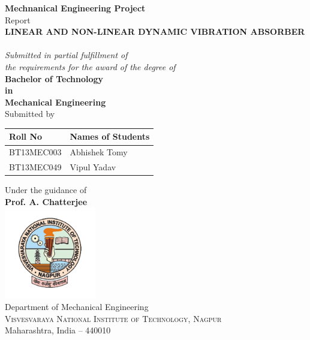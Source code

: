 %
%
%
\begin{titlepage}
\boxit
\begin{center}
\textup{ {\bf Mechnanical Engineering Project} \\ Report}\\[0.2in]
\huge \textbf {\color{red}\uppercase{Linear and Non-linear Dynamic Vibration Absorber}}\\[0.1in]
\Large \textbf{} \\ [0in]
       \small \emph{Submitted in partial fulfillment of\\
       the requirements for the award of the degree of}\\[0.1in]

	{\bf \color{blue} Bachelor of Technology \\in\\ Mechanical Engineering}\\[0.2in]

\normalsize Submitted by \\
\begin{table}[h]
\centering
\begin{tabular}{ll}\hline 
Roll No & Names of Students \\  \hline
BT13MEC003 & Abhishek Tomy\\
BT13MEC049 & Vipul Yadav
 \\  \hline 
\end{tabular}
\end{table}

Under the guidance of\\
{\textbf{Prof. A. Chatterjee}}\\[0.2in]

\includegraphics[width=0.3\textwidth]{"figures/vnitLogo"}\\[0.1in]
\Large{Department of Mechanical Engineering}\\
\normalsize
\textsc{Visvesvaraya National Institute of Technology, Nagpur}\\
Maharashtra, India -- 440010 \\
\end{center}

\end{titlepage}

